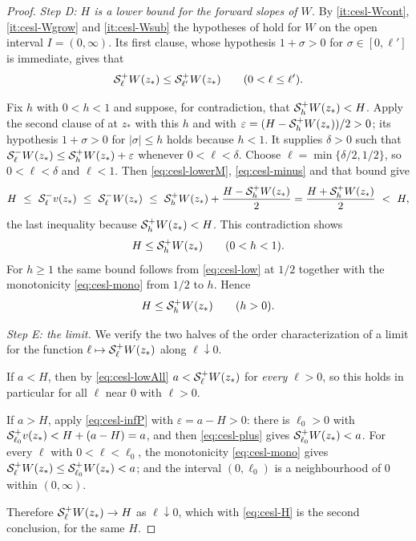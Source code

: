 \begin{proof}
\emph{Step D: $H$ is a lower bound for the forward slopes of $W$.} By
\ref{it:cesl-Wcont}, \ref{it:cesl-Wgrow} and \ref{it:cesl-Wsub} the hypotheses
of  hold for $W$ on the open interval
$I=(0,\infty)$. Its first clause, whose hypothesis $1+\sigma>0$ for
$\sigma\in[0,\ell']$ is immediate, gives that
\begin{equation}\label{eq:cesl-mono}
  \mathcal{S}_\ell^+W(z_*)\le\mathcal{S}_{\ell'}^+W(z_*)\qquad(0<\ell\le\ell').
\end{equation}

Fix $h$ with $0<h<1$ and suppose, for contradiction, that
$\mathcal{S}_h^+W(z_*)<H$. Apply the second clause of  at
$z_*$ with this $h$ and with
$\varepsilon=(H-\mathcal{S}_h^+W(z_*))/2>0$; its hypothesis $1+\sigma>0$ for
$|\sigma|\le h$ holds because $h<1$. It supplies $\delta>0$ such that
$\mathcal{S}_\ell^-W(z_*)\le\mathcal{S}_h^+W(z_*)+\varepsilon$ whenever $0<\ell<\delta$.
Choose $\ell=\min\{\delta/2,1/2\}$, so $0<\ell<\delta$ and $\ell<1$. Then
\eqref{eq:cesl-lowerM}, \eqref{eq:cesl-minus} and that bound give
\[
  H\ \le\ \Senv_\ell^-v(z_*)\ \le\ \Senv_\ell^-W(z_*)
   \ \le\ \Senv_h^+W(z_*)+\frac{H-\Senv_h^+W(z_*)}{2}
   =\frac{H+\Senv_h^+W(z_*)}{2}\ <\ H ,
\]
the last inequality because $\mathcal{S}_h^+W(z_*)<H$. This contradiction shows
\begin{equation}\label{eq:cesl-low}
  H\le\mathcal{S}_h^+W(z_*)\qquad(0<h<1).
\end{equation}
For $h\ge1$ the same bound follows from \eqref{eq:cesl-low} at $1/2$ together
with the monotonicity \eqref{eq:cesl-mono} from $1/2$ to $h$. Hence
\begin{equation}\label{eq:cesl-lowAll}
  H\le\mathcal{S}_h^+W(z_*)\qquad(h>0).
\end{equation}

\emph{Step E: the limit.} We verify the two halves of the order
characterization of a limit for the function $\ell\mapsto\mathcal{S}_\ell^+W(z_*)$
along $\ell\downarrow0$.

If $a<H$, then by \eqref{eq:cesl-lowAll} $a<\mathcal{S}_\ell^+W(z_*)$ for
\emph{every} $\ell>0$, so this holds in particular for all $\ell$ near $0$ with
$\ell>0$.

If $a>H$, apply \eqref{eq:cesl-infP} with $\varepsilon=a-H>0$: there is
$\ell_0>0$ with $\mathcal{S}_{\ell_0}^+v(z_*)<H+(a-H)=a$, and then
\eqref{eq:cesl-plus} gives $\mathcal{S}_{\ell_0}^+W(z_*)<a$. For every $\ell$ with
$0<\ell<\ell_0$, the monotonicity \eqref{eq:cesl-mono} gives
$\mathcal{S}_\ell^+W(z_*)\le\mathcal{S}_{\ell_0}^+W(z_*)<a$; and the interval
$(0,\ell_0)$ is a neighbourhood of $0$ within $(0,\infty)$.

Therefore $\mathcal{S}_\ell^+W(z_*)\to H$ as $\ell\downarrow0$, which with
\eqref{eq:cesl-H} is the second conclusion, for the same $H$.
\end{proof}

